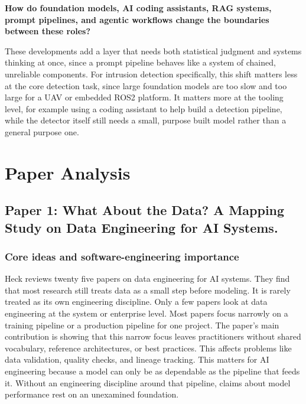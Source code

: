 \documentclass[11pt,a4paper]{article}
\begin{document}
\textbf{How do foundation models, AI coding assistants, RAG systems, prompt pipelines, and agentic workflows change the boundaries between these roles?}

These developments add a layer that needs both statistical judgment and systems thinking at once, since a prompt pipeline behaves like a system of chained, unreliable components. For intrusion detection specifically, this shift matters less at the core detection task, since large foundation models are too slow and too large for a UAV or embedded ROS2 platform. It matters more at the tooling level, for example using a coding assistant to help build a detection pipeline, while the detector itself still needs a small, purpose built model rather than a general purpose one.





\section{Paper Analysis}

\subsection{Paper 1: What About the Data? A Mapping Study on Data Engineering for AI
Systems.}

\subsubsection{Core ideas and software-engineering importance}
Heck reviews twenty five papers on data engineering for AI systems. They find that most research still treats data as a small step before modeling. It is rarely treated as its own engineering discipline. Only a few papers look at data engineering at the system or enterprise level. Most papers focus narrowly on a training pipeline or a production pipeline for one project. The paper's main contribution is showing that this narrow focus leaves practitioners without shared vocabulary, reference architectures, or best practices. This affects problems like data validation, quality checks, and lineage tracking. This matters for AI engineering because a model can only be as dependable as the pipeline that feeds it. Without an engineering discipline around that pipeline, claims about model performance rest on an unexamined foundation.
\end{document}
